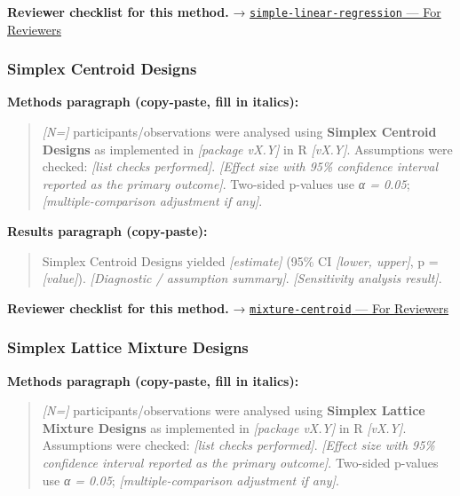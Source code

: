 \documentclass[
]{article}
\begin{document}
\textbf{Reviewer checklist for this method.} →
\href{../chapters/07-regression/simple-linear-regression.Rmd\#for-reviewers}{\texttt{simple-linear-regression}
--- For Reviewers}

\subsubsection{Simplex Centroid Designs}\label{simplex-centroid-designs}

\textbf{Methods paragraph (copy-paste, fill in italics):}

\begin{quote}
\emph{{[}N={]}} participants/observations were analysed using
\textbf{Simplex Centroid Designs} as implemented in \emph{{[}package
vX.Y{]}} in R \emph{{[}vX.Y{]}}. Assumptions were checked: \emph{{[}list
checks performed{]}}. \emph{{[}Effect size with 95\% confidence interval
reported as the primary outcome{]}}. Two-sided p-values use \emph{α =
0.05}; \emph{{[}multiple-comparison adjustment if any{]}}.
\end{quote}

\textbf{Results paragraph (copy-paste):}

\begin{quote}
Simplex Centroid Designs yielded \emph{{[}estimate{]}} (95\% CI
\emph{{[}lower, upper{]}}, p = \emph{{[}value{]}}). \emph{{[}Diagnostic
/ assumption summary{]}}. \emph{{[}Sensitivity analysis result{]}}.
\end{quote}

\textbf{Reviewer checklist for this method.} →
\href{../chapters/16-design/mixture-centroid.Rmd\#for-reviewers}{\texttt{mixture-centroid}
--- For Reviewers}

\subsubsection{Simplex Lattice Mixture
Designs}\label{simplex-lattice-mixture-designs}

\textbf{Methods paragraph (copy-paste, fill in italics):}

\begin{quote}
\emph{{[}N={]}} participants/observations were analysed using
\textbf{Simplex Lattice Mixture Designs} as implemented in
\emph{{[}package vX.Y{]}} in R \emph{{[}vX.Y{]}}. Assumptions were
checked: \emph{{[}list checks performed{]}}. \emph{{[}Effect size with
95\% confidence interval reported as the primary outcome{]}}. Two-sided
p-values use \emph{α = 0.05}; \emph{{[}multiple-comparison adjustment if
any{]}}.
\end{quote}
\end{document}
